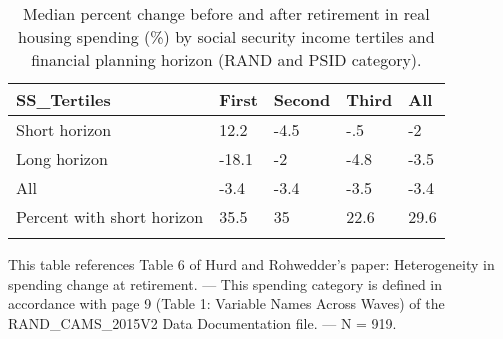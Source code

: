 \begin{table}[tbp] \centering
{}

\caption{Median percent change before and after retirement in real housing spending (\%) by social security income tertiles and financial planning horizon (RAND and PSID category).}
\begin{tabularx}{\textwidth}{lCCCC}

\toprule
{SS\_Tertiles}&{First}&{Second}&{Third}&{All} \tabularnewline
\midrule\addlinespace[1.5ex]
Short horizon&12.2&-4.5&-.5&-2 \tabularnewline
Long horizon&-18.1&-2&-4.8&-3.5 \tabularnewline
All&-3.4&-3.4&-3.5&-3.4 \tabularnewline
Percent with short horizon&35.5&35&22.6&29.6 \tabularnewline
\bottomrule \addlinespace[1.5ex]

\end{tabularx}
\begin{flushleft}
\footnotesize This table references Table 6 of Hurd and Rohwedder's paper: Heterogeneity in spending change at retirement. \linebreak --- \linebreak This spending category is defined in accordance with page 9 (Table 1: Variable Names Across Waves) of the RAND\_CAMS\_2015V2 Data Documentation file. \linebreak --- \linebreak N = 919.
\end{flushleft}
\end{table}
